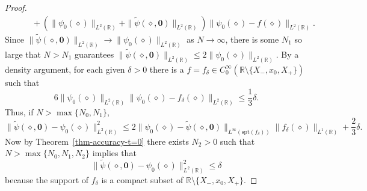 \documentclass[12pt]{amsart}
\numberwithin{equation}{section}
\begin{document}
\begin{proof}
\begin{equation}
\begin{split}
&\qquad{}+\left(\|\psi_0(\diamond)\|_{L^2(\mathbb{R})}+\|\widetilde{\psi}(\diamond,\mathbf{0})\|_{L^2(\mathbb{R})}\right)\|\psi_0(\diamond)-f(\diamond)\|_{L^2(\mathbb{R})}.
\end{split}
\end{equation}
Since $\|\widetilde{\psi}(\diamond,\mathbf{0})\|_{L^2(\mathbb{R})}\to\|\psi_0(\diamond)\|_{L^2(\mathbb{R})}$ as $N\to\infty$, there is some $N_1$ so large that $N>N_1$ guarantees $\|\widetilde{\psi}(\diamond,\mathbf{0})\|_{L^2(\mathbb{R})}\le 2\|\psi_0(\diamond)\|_{L^2(\mathbb{R})}$.  
By a density argument, for each given $\delta>0$ there is a $f=f_\delta\in C_0^\infty(\mathbb{R}\setminus\{X_-,x_0,X_+\})$ such that 
\begin{equation}
6\|\psi_0(\diamond)\|_{L^2(\mathbb{R})}\|\psi_0(\diamond)-f_\delta(\diamond)\|_{L^2(\mathbb{R})}\le\frac{1}{3}\delta.
\end{equation}
Thus, if $N>\max\{N_0,N_1\}$, 
\begin{equation}
\|\widetilde{\psi}(\diamond,\mathbf{0})-\psi_0(\diamond)\|_{L^2(\mathbb{R})}^2\le 2\|\psi_0(\diamond)-\widetilde{\psi}(\diamond,\mathbf{0})\|_{L^\infty(\mathrm{spt}(f_\delta))}\|f_\delta(\diamond)\|_{L^1(\mathbb{R})} + \frac{2}{3}\delta.
\end{equation}
Now by Theorem~\ref{thm-accuracy-t=0} there exists $N_2>0$ such that $N>\max\{N_0,N_1,N_2\}$ implies that
\begin{equation}
\|\widetilde{\psi}(\diamond,\mathbf{0})-\psi_0(\diamond)\|_{L^2(\mathbb{R})}^2\le \delta
\end{equation}
because the support of $f_\delta$ is a compact subset of $\mathbb{R}\setminus\{X_-,x_0,X_+\}$.
\end{proof}
\end{document}
